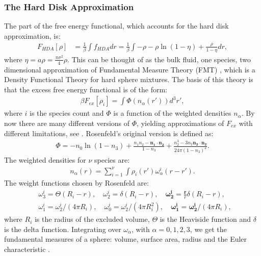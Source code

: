 \subsubsection{The Hard Disk Approximation}
The part of the free energy functional, which accounts for the hard disk approximation, is:
\begin{align*}
	F_{HDA}[\rho] &= \frac{1}{\beta} \int  f_{HDA} dr = \frac{1}{\beta} \int   -  \rho - \rho \ln(1 - \eta) + \frac{\rho}{1 - \eta} dr,
\end{align*}
where $\eta = a \rho = \frac{\pi \sigma^2}{4} \rho$.
This can be thought of as the bulk fluid, one species, two dimensional approximation of Fundamental Measure Theory (FMT)  \cite{RosenfeldFMT}, which is a Density Functional Theory for hard sphere mixtures. The basis of this theory is that the excess free energy functional is of the form:
\begin{align*}
	\beta F_{ex}[{\rho_i}] = \int \Phi({n_\alpha(r')})d^3r',
\end{align*} 
where $i$ is the species count and $\Phi$ is a function of the weighted densities $n_\alpha$. By now there are many different versions of $\Phi$, yielding approximations of $F_{ex}$ with different limitations, see \cite{Roth_2010FMTReview}. Rosenfeld's original version is defined as:
	\begin{align*}
	\Phi = -n_0 \ln(1-n_3) + \frac{n_1 n_2 - \mathbf{n_1} \cdot \mathbf{n_2}}{1-n_3} + \frac{n_2^3 - 3n_2 \mathbf{n_2} \cdot \mathbf{n_2}}{24 \pi (1-n_3)^2}.
	\end{align*}
The weighted densities for $\nu$ species are:
	\begin{align} \label{eqn:WeightedDensities}
		n_\alpha (r) = \sum_{i=1}^\nu \int \rho_i(r') \omega_\alpha^i(r -r').
	\end{align}
The weight functions chosen by Rosenfeld are:
\begin{align*}
	&\omega_3^i = \Theta(R_i -r),\quad \omega_2^i = \delta(R_i -r),\quad \mathbf{\omega_2^i} = \frac{\mathbf r}{r}\delta (R_i -r),\quad \\
	&\omega_1^i = \omega_2^i/(4 \pi R_i), \quad \omega_0^i = \omega_2^i/(4\pi R_i^2), \quad \mathbf{\omega_1^i} = \mathbf{\omega_2^i}/(4 \pi R_i),
\end{align*}
where $R_i$ is the radius of the excluded volume, $\Theta$ is the Heaviside function and $\delta$ is the delta function. Integrating over $\omega_\alpha$, with $\alpha = 0,1,2,3$, we get the fundamental measures of a sphere: volume, surface area, radius and the Euler characteristic \cite{Roth_2010FMTReview} \cite{RosenfeldFMT}.
